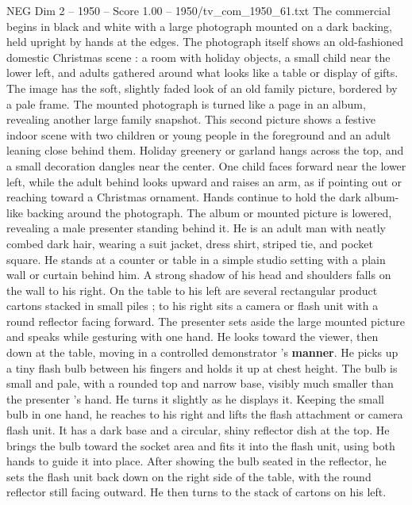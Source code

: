 \begin{textsample}{NEG Dim 2 – 1950 – Score 1.00 – 1950/tv\_com\_1950\_61.txt}  \label{ex:f2_neg_019}
The commercial begins in black and white with a large photograph mounted on a dark backing, held upright by hands at the edges.
The photograph itself shows an old-fashioned domestic Christmas scene : a room with holiday objects, a small child near the lower left, and adults gathered around what looks like a table or display of gifts.
The image has the soft, slightly faded look of an old family picture, bordered by a pale frame.
The mounted photograph is turned like a page in an album, revealing another large family snapshot.
This second picture shows a festive indoor scene with two children or young people in the foreground and an adult leaning close behind them.
Holiday greenery or garland hangs across the top, and a small decoration dangles near the center.
One child faces forward near the lower left, while the adult behind looks upward and raises an arm, as if pointing out or reaching toward a Christmas ornament.
Hands continue to hold the dark album-like backing around the photograph.
The album or mounted picture is lowered, revealing a male presenter standing behind it.
He is an adult man with neatly combed dark hair, wearing a suit jacket, dress shirt, striped tie, and pocket square.
He stands at a counter or table in a simple studio setting with a plain wall or curtain behind him.
A strong shadow of his head and shoulders falls on the wall to his right.
On the table to his left are several rectangular product cartons stacked in small piles ; to his right sits a camera or flash unit with a round reflector facing forward.
The presenter sets aside the large mounted picture and speaks while gesturing with one hand.
He looks toward the viewer, then down at the table, moving in a controlled demonstrator ’s \textbf{manner}.
He picks up a tiny flash bulb between his fingers and holds it up at chest height.
The bulb is small and pale, with a rounded top and narrow base, visibly much smaller than the presenter ’s hand.
He turns it slightly as he displays it.
Keeping the small bulb in one hand, he reaches to his right and lifts the flash attachment or camera flash unit.
It has a dark base and a circular, shiny reflector dish at the top.
He brings the bulb toward the socket area and fits it into the flash unit, using both hands to guide it into place.
After showing the bulb seated in the reflector, he sets the flash unit back down on the right side of the table, with the round reflector still facing outward.
He then turns to the stack of cartons on his left.

\end{textsample}
